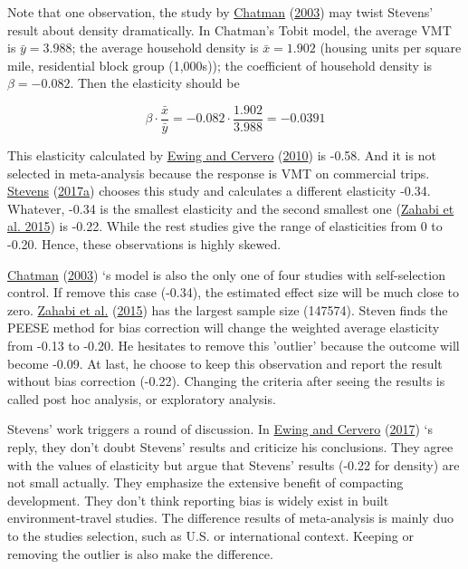 \documentclass[
  11pt,
  openany]{memoir}
\begin{document}
Note that one observation, the study by \protect\hyperlink{ref-chatmanHowDensityMixed2003}{Chatman} (\protect\hyperlink{ref-chatmanHowDensityMixed2003}{2003}) may twist Stevens' result about density dramatically. In Chatman's Tobit model, the average VMT is \(\bar y= 3.988\); the average household density is \(\bar x= 1.902\) (housing units per square mile, residential block group (1,000s)); the coefficient of household density is \(\beta=-0.082\). Then the elasticity should be

\[
\beta\cdot\frac{\bar x}{\bar y}=-0.082\cdot\frac{1.902}{3.988}=-0.0391
\]

This elasticity calculated by \protect\hyperlink{ref-ewingTravelBuiltEnvironment2010}{Ewing and Cervero} (\protect\hyperlink{ref-ewingTravelBuiltEnvironment2010}{2010}) is -0.58. And it is not selected in meta-analysis because the response is VMT on commercial trips. \protect\hyperlink{ref-stevensDoesCompactDevelopment2017}{Stevens} (\protect\hyperlink{ref-stevensDoesCompactDevelopment2017}{2017a}) chooses this study and calculates a different elasticity -0.34. Whatever, -0.34 is the smallest elasticity and the second smallest one (\protect\hyperlink{ref-zahabiSpatiotemporalAnalysisCar2015}{Zahabi et al. 2015}) is -0.22. While the rest studies give the range of elasticities from 0 to -0.20. Hence, these observations is highly skewed.

\protect\hyperlink{ref-chatmanHowDensityMixed2003}{Chatman} (\protect\hyperlink{ref-chatmanHowDensityMixed2003}{2003}) `s model is also the only one of four studies with self-selection control. If remove this case (-0.34), the estimated effect size will be much close to zero. \protect\hyperlink{ref-zahabiSpatiotemporalAnalysisCar2015}{Zahabi et al.} (\protect\hyperlink{ref-zahabiSpatiotemporalAnalysisCar2015}{2015}) has the largest sample size (147574). Steven finds the PEESE method for bias correction will change the weighted average elasticity from -0.13 to -0.20. He hesitates to remove this 'outlier' because the outcome will become -0.09. At last, he choose to keep this observation and report the result without bias correction (-0.22). Changing the criteria after seeing the results is called post hoc analysis, or exploratory analysis.

Stevens' work triggers a round of discussion. In \protect\hyperlink{ref-ewingDoesCompactDevelopment2017}{Ewing and Cervero} (\protect\hyperlink{ref-ewingDoesCompactDevelopment2017}{2017}) `s reply, they don't doubt Stevens' results and criticize his conclusions. They agree with the values of elasticity but argue that Stevens' results (-0.22 for density) are not small actually. They emphasize the extensive benefit of compacting development. They don't think reporting bias is widely exist in built environment-travel studies. The difference results of meta-analysis is mainly duo to the studies selection, such as U.S. or international context. Keeping or removing the outlier is also make the difference.
\end{document}
